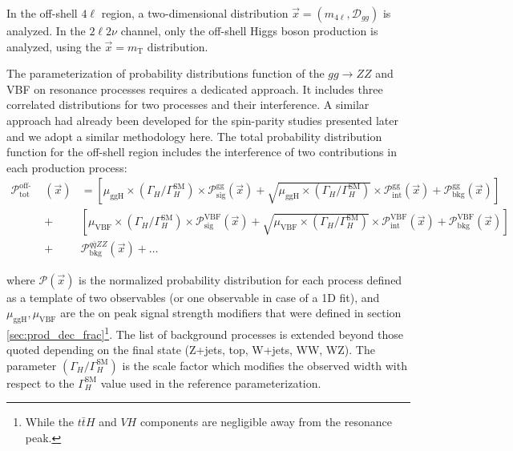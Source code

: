 In the off-shell $4\ell$ region, a two-dimensional distribution $\vec{x}=(m_{4\ell}, \mathcal{D}_{gg})$
is analyzed. In the $2\ell2\nu$ channel, only the off-shell Higgs boson production is analyzed,
using the $\vec{x}=m_\mathrm{T}$ distribution.

The parameterization of probability distributions function of the $gg\to ZZ$ and VBF on resonance processes requires a dedicated 
approach. It includes three correlated distributions for two processes and their interference. A similar 
approach had already been developed for the spin-parity studies presented later and we adopt a similar methodology here. The total probability distribution function for the off-shell region includes the interference of two
contributions in each production process:
 \begingroup
 \footnotesize
 \begin{eqnarray}
 \mathcal{P}_\text{tot}^\text{off-shell}&(\vec{x})&  =
\left[\mu_{\text{ggH}}\times\left(\Gamma_{H}/\Gamma_{H}^{\textrm{SM}}\right) \times \mathcal{P}^{\text{gg}}_\text{sig}\left(\vec{x}\right) +  \sqrt{\mu_{\text{ggH}}\times\left(\Gamma_{H}/\Gamma_{H}^{\textrm{SM}}\right)} \times  \mathcal{P}^{\text{gg}}_\text{int}(\vec{x})+ \mathcal{P}^{\text{gg}}_\text{bkg}(\vec{x}) \right] \nonumber \\
  &+& \left[\mu_{\text{VBF}}\times\left(\Gamma_{H}/\Gamma_{H}^{\textrm{SM}}\right) \times \mathcal{P}^{\text{VBF}}_\text{sig}\left(\vec{x}\right) +  \sqrt{\mu_{\text{VBF}}\times\left(\Gamma_{H}/\Gamma_{H}^{\textrm{SM}}\right)} \times  \mathcal{P}^{\text{VBF}}_\text{int}(\vec{x})+ \mathcal{P}^{\text{VBF}}_\text{bkg}(\vec{x}) \right] \nonumber \\
  &+& \mathcal{P}^{q\bar{q}ZZ}_\text{bkg}(\vec{x}) + \ldots
\label{eq:pdf-prob-vbf}
\end{eqnarray}
\endgroup

where $\mathcal{P}\left(\vec{x}\right)$ is the normalized probability distribution for each process
defined as a template of two observables (or one observable in case of a 1D fit), and $\mu_{\text{ggH}}, \mu_{\text{VBF}}$ are the on peak signal strength modifiers that were defined in section \ref{sec:prod_dec_frac}\footnote{While the $t\bar{t}H$ and $VH$ components are negligible away from the resonance peak.}. The list of background processes is extended beyond those quoted depending on the final state (Z+jets, top, W+jets, WW, WZ). The parameter $(\Gamma_{H}/\Gamma_{H}^{\text{SM}})$ is the scale factor which modifies the observed width with respect to the $\Gamma_{H}^{\text{SM}}$ value used in the reference parameterization.

